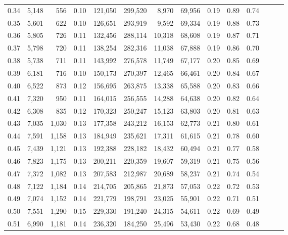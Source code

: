 \begin{tabular}{rrrrrrrrrrrrrr}
0.34 &   5,148 &    556 &  0.10 &  121,050 &  299,520 &   8,970 &  69,956 &  0.19 &  0.89 &      0.74 \\
0.35 &   5,601 &    622 &  0.10 &  126,651 &  293,919 &   9,592 &  69,334 &  0.19 &  0.88 &      0.73 \\
0.36 &   5,805 &    726 &  0.11 &  132,456 &  288,114 &  10,318 &  68,608 &  0.19 &  0.87 &      0.71 \\
0.37 &   5,798 &    720 &  0.11 &  138,254 &  282,316 &  11,038 &  67,888 &  0.19 &  0.86 &      0.70 \\
0.38 &   5,738 &    711 &  0.11 &  143,992 &  276,578 &  11,749 &  67,177 &  0.20 &  0.85 &      0.69 \\
0.39 &   6,181 &    716 &  0.10 &  150,173 &  270,397 &  12,465 &  66,461 &  0.20 &  0.84 &      0.67 \\
0.40 &   6,522 &    873 &  0.12 &  156,695 &  263,875 &  13,338 &  65,588 &  0.20 &  0.83 &      0.66 \\
0.41 &   7,320 &    950 &  0.11 &  164,015 &  256,555 &  14,288 &  64,638 &  0.20 &  0.82 &      0.64 \\
0.42 &   6,308 &    835 &  0.12 &  170,323 &  250,247 &  15,123 &  63,803 &  0.20 &  0.81 &      0.63 \\
0.43 &   7,035 &  1,030 &  0.13 &  177,358 &  243,212 &  16,153 &  62,773 &  0.21 &  0.80 &      0.61 \\
0.44 &   7,591 &  1,158 &  0.13 &  184,949 &  235,621 &  17,311 &  61,615 &  0.21 &  0.78 &      0.60 \\
0.45 &   7,439 &  1,121 &  0.13 &  192,388 &  228,182 &  18,432 &  60,494 &  0.21 &  0.77 &      0.58 \\
0.46 &   7,823 &  1,175 &  0.13 &  200,211 &  220,359 &  19,607 &  59,319 &  0.21 &  0.75 &      0.56 \\
0.47 &   7,372 &  1,082 &  0.13 &  207,583 &  212,987 &  20,689 &  58,237 &  0.21 &  0.74 &      0.54 \\
0.48 &   7,122 &  1,184 &  0.14 &  214,705 &  205,865 &  21,873 &  57,053 &  0.22 &  0.72 &      0.53 \\
0.49 &   7,074 &  1,152 &  0.14 &  221,779 &  198,791 &  23,025 &  55,901 &  0.22 &  0.71 &      0.51 \\
0.50 &   7,551 &  1,290 &  0.15 &  229,330 &  191,240 &  24,315 &  54,611 &  0.22 &  0.69 &      0.49 \\
0.51 &   6,990 &  1,181 &  0.14 &  236,320 &  184,250 &  25,496 &  53,430 &  0.22 &  0.68 &      0.48 \\

\end{tabular}
